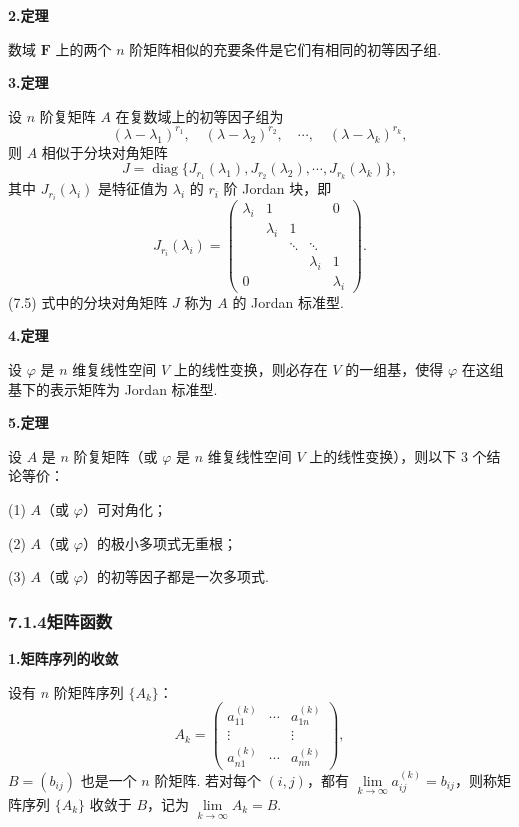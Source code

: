 \documentclass[UTF8, 12pt, fontset=fandol, oneside]{ctexart}
\begin{document}
\noindent\textbf{2.\quad 定理}

数域 $\mathbf{F}$ 上的两个 $n$ 阶矩阵相似的充要条件是它们有相同的初等因子组.

\noindent\textbf{3.\quad 定理}

设 $n$ 阶复矩阵 $A$ 在复数域上的初等因子组为
\[
(\lambda-\lambda_1)^{r_1},\quad
(\lambda-\lambda_2)^{r_2},\quad
\cdots,\quad
(\lambda-\lambda_k)^{r_k},
\]
则 $A$ 相似于分块对角矩阵
\begin{equation}
J=\operatorname{diag}\{J_{r_1}(\lambda_1),J_{r_2}(\lambda_2),\cdots,J_{r_k}(\lambda_k)\},
\tag{7.5}
\end{equation}
其中 $J_{r_i}(\lambda_i)$ 是特征值为 $\lambda_i$ 的 $r_i$ 阶 Jordan 块，即
\[
J_{r_i}(\lambda_i)=
\left(\begin{array}{ccccc}
\lambda_i & 1 &        &        & 0\\
          & \lambda_i & 1      &        &  \\
          &           & \ddots & \ddots &  \\
          &           &        & \lambda_i & 1\\
0         &           &        &           & \lambda_i
\end{array}\right).
\]
(7.5) 式中的分块对角矩阵 $J$ 称为 $A$ 的 Jordan 标准型.

\noindent\textbf{4.\quad 定理}

设 $\varphi$ 是 $n$ 维复线性空间 $V$ 上的线性变换，则必存在 $V$ 的一组基，使得 $\varphi$ 在这组基下的表示矩阵为 Jordan 标准型.

\noindent\textbf{5.\quad 定理}

设 $A$ 是 $n$ 阶复矩阵（或 $\varphi$ 是 $n$ 维复线性空间 $V$ 上的线性变换），则以下 3 个结论等价：

(1) $A$（或 $\varphi$）可对角化；

(2) $A$（或 $\varphi$）的极小多项式无重根；

(3) $A$（或 $\varphi$）的初等因子都是一次多项式.

\subsubsection*{7.1.4\quad 矩阵函数}

\noindent\textbf{1.\quad 矩阵序列的收敛}

设有 $n$ 阶矩阵序列 $\{A_k\}$：
\[
A_k=
\left(\begin{array}{ccc}
a_{11}^{(k)} & \cdots & a_{1n}^{(k)}\\
\vdots       &        & \vdots\\
a_{n1}^{(k)} & \cdots & a_{nn}^{(k)}
\end{array}\right),
\]
$B=(b_{ij})$ 也是一个 $n$ 阶矩阵. 若对每个 $(i,j)$，都有 $\lim\limits_{k\to\infty}a_{ij}^{(k)}=b_{ij}$，则称矩阵序列 $\{A_k\}$ 收敛于 $B$，记为 $\lim\limits_{k\to\infty}A_k=B$.
\end{document}
